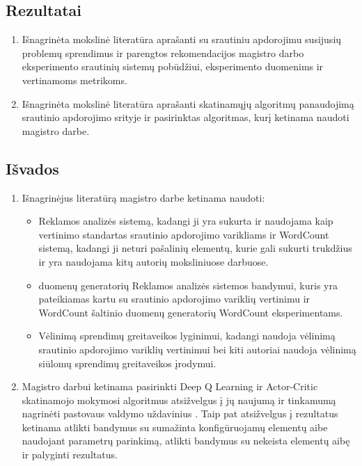 \documentclass{VUMIFPSbakalaurinis}
\begin{document}
\subsection{Rezultatai}
\begin{enumerate}
    \item Išnagrinėta mokslinė literatūra aprašanti su srautiniu apdorojimu susijusių problemų sprendimus ir parengtos rekomendacijos magistro darbo eksperimento srautinių sistemų pobūdžiui, eksperimento duomenims ir vertinamoms metrikoms.
    \item Išnagrinėta mokslinė literatūra aprašanti skatinamųjų algoritmų panaudojimą srautinio apdorojimo srityje ir pasirinktas algoritmas, kurį ketinama naudoti magistro darbe.  
\end{enumerate}

\subsection{Išvados}
\begin{enumerate}
    \item Išnagrinėjus literatūrą magistro darbe ketinama naudoti:
        \begin{itemize}
            \item Reklamos analizės sistemą, kadangi ji yra sukurta ir naudojama kaip vertinimo standartas srautinio apdorojimo varikliams ir WordCount sistemą, kadangi ji neturi pašalinių elementų, kurie gali sukurti trukdžius ir yra naudojama kitų autorių moksliniuose darbuose.
            \item \cite{Chintapalli2016Benchmarking} duomenų generatorių Reklamos analizės sistemos bandymui, kuris yra pateikiamas kartu su srautinio apdorojimo variklių vertinimu ir WordCount šaltinio duomenų generatorių WordCount eksperimentams.
            \item Vėlinimą sprendimų greitaveikos lyginimui, kadangi \cite{Chintapalli2016Benchmarking} naudoja vėlinimą srautinio apdorojimo variklių vertinimui bei kiti autoriai naudoja vėlinimą siūlomų sprendimų greitaveikos įrodymui.  
        \end{itemize}
    \item Magistro darbui ketinama pasirinkti Deep Q Learning ir Actor-Critic skatinamojo mokymosi algoritmus atsižvelgus į jų naujumą ir tinkamumą nagrinėti pastovaus valdymo uždavinius \cite{Silver2014Deterministic}. Taip pat atsižvelgus į \cite{vaquero2018autotuning, herodotou2020survey} rezultatus ketinama atlikti bandymus su sumažinta konfigūruojamų elementų aibe naudojant parametrų parinkimą, atlikti bandymus su nekeista elementų aibę ir palyginti rezultatus.
\end{enumerate}

\printbibliography[heading=bibintoc] 
\end{document}
